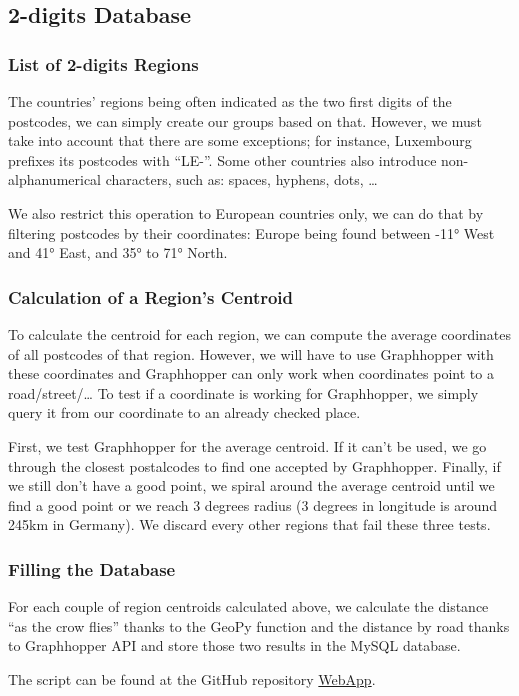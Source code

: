 \subsection{2-digits Database}

\subsubsection{List of 2-digits Regions}

The countries' regions being often indicated as the two first digits of the
postcodes, we can simply create our groups based on that.
However, we must take into account that there are some exceptions; for instance,
Luxembourg prefixes its postcodes with ``LE-''.
Some other countries also introduce non-alphanumerical characters, such as:
spaces, hyphens, dots, \ldots{}

We also restrict this operation to European countries only, we can do that by filtering
postcodes by their coordinates: Europe being found between -11° West and 41° East,
and 35° to 71° North.

\subsubsection{Calculation of a Region's Centroid}

To calculate the centroid for each region, we can compute the average coordinates
of all postcodes of that region. However, we will have to use Graphhopper with
these coordinates and Graphhopper can only work when coordinates point to a
road/street/\ldots{}
To test if a coordinate is working for Graphhopper, we simply query it from our
coordinate to an already checked place.

First, we test Graphhopper for the average centroid. If it can't be used, we go
through the closest postalcodes to find one accepted by Graphhopper. Finally, if
we still don't have a good point, we spiral around the average centroid until we
find a good point or we reach 3 degrees radius (3 degrees in longitude is around
245km in Germany). We discard every other regions that fail these three tests.

\subsubsection{Filling the Database}

For each couple of region centroids calculated above, we calculate the distance
``as the crow flies'' thanks to the GeoPy function and the distance by road thanks
to Graphhopper API and store those two results in the MySQL database.

The script can be found at the GitHub repository \href{https://github.com/dataBikeHsUlm/WebApp/blob/master/fill_db_with_distances_2digits.py}{WebApp}.
